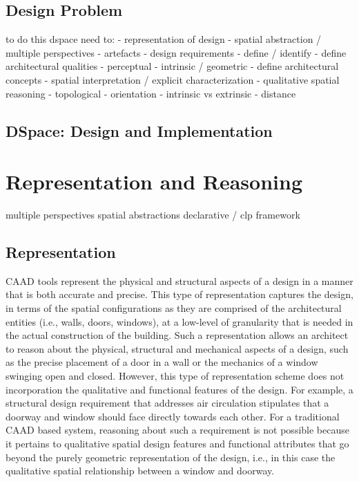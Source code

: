 \documentclass[12pt]{ucthesis}
\begin{document}
\section{Design Problem}

to do this dspace need to:
 - representation of design
 	- spatial abstraction / multiple perspectives
 	- artefacts
 - design requirements - define / identify
 	- define architectural qualities
 		- perceptual
 		- intrinsic / geometric
 	- define architectural concepts
	- spatial interpretation / explicit characterization
 - qualitative spatial reasoning
 	- topological 
 	- orientation
 		- intrinsic vs extrinsic
 	- distance


\section{DSpace: Design and Implementation}


\chapter{Representation and Reasoning}
multiple perspectives
spatial abstractions
declarative / clp framework

\section{Representation}
CAAD tools represent the physical and structural aspects of a design in a manner that is both accurate and precise. This type of representation captures the design, in terms of the spatial configurations as they are comprised of the architectural entities (i.e., walls, doors, windows), at a low-level of granularity that is needed in the actual construction of the building. Such a representation allows an architect to reason about the physical, structural and mechanical aspects of a design, such as the precise placement of a door in a wall or the mechanics of a window swinging open and closed. However, this type of representation scheme does not incorporation the qualitative and functional features of the design. For example, a structural design requirement that addresses air circulation stipulates that a doorway and window should face directly towards each other. For a traditional CAAD based system, reasoning about such a requirement is not possible because it pertains to qualitative spatial design features and functional attributes that go beyond the purely geometric representation of the design, i.e., in this case the qualitative spatial relationship between a window and doorway. 
\end{document}
